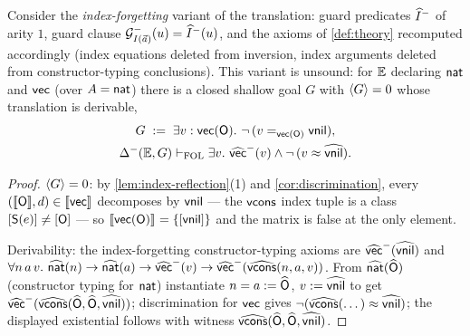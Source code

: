 \begin{proposition}
\label{prop:index-dropping}
Consider the \emph{index-forgetting} variant of the translation: guard
predicates $\widehat{I}^-$ of arity $1$, guard clause
$\mathcal{G}^-_{I(\vec{a})}(u) = \widehat{I}^-(u)$, and the axioms of
\cref{def:theory} recomputed accordingly (index equations deleted from
inversion, index arguments deleted from constructor-typing
conclusions).  This variant is unsound: for $\mathbb{E}$ declaring $\mathsf{nat}$ and
$\mathsf{vec}$ (over $A = \mathsf{nat}$) there is a closed shallow goal $G$ with
$\langle G \rangle = 0$ whose translation is derivable,
\begin{gather*}
  G \;\mathrel{:=}\; \exists v : \mathsf{vec}(\mathsf{O}).\ \neg\,(v =_{\mathsf{vec}(\mathsf{O})}
  \mathsf{vnil}),\\
  \Delta^-(\mathbb{E}, G) \vdash_{\mathrm{FOL}} \exists v.\ \widehat{\mathsf{vec}}^-(v) \wedge
  \neg\,(v \approx \widehat{\mathsf{vnil}}).
\end{gather*}
\end{proposition}

\begin{proof}
$\langle G \rangle = 0$: by \cref{lem:index-reflection}(1) and
\cref{cor:discrimination}, every $([\![ \mathsf{O} ]\!], d) \in [\![ \mathsf{vec} ]\!]_{}$
decomposes by $\mathsf{vnil}$ --- the $\mathsf{vcons}$ index tuple is a class
$[\mathsf{S}(e)] \neq [\mathsf{O}]$ --- so $[\![ \mathsf{vec}(\mathsf{O}) ]\!]_{} =
\{[\mathsf{vnil}]\}$ and the matrix is false at the only element.

Derivability: the index-forgetting constructor-typing axioms are
$\widehat{\mathsf{vec}}^-(\widehat{\mathsf{vnil}})$ and $\forall n\,a\,v.\ \widehat{\mathsf{nat}}(n)
\to \widehat{\mathsf{nat}}(a) \to \widehat{\mathsf{vec}}^-(v) \to
\widehat{\mathsf{vec}}^-(\widehat{\mathsf{vcons}}(n,a,v))$.  From $\widehat{\mathsf{nat}}(\widehat{\mathsf{O}})$
(constructor typing for $\mathsf{nat}$) instantiate $n = a \mathrel{:=} \widehat{\mathsf{O}}$,
$v \mathrel{:=} \widehat{\mathsf{vnil}}$ to get
$\widehat{\mathsf{vec}}^-(\widehat{\mathsf{vcons}}(\widehat{\mathsf{O}}, \widehat{\mathsf{O}},
\widehat{\mathsf{vnil}}))$; discrimination for $\mathsf{vec}$ gives
$\neg(\widehat{\mathsf{vcons}}(\dots) \approx \widehat{\mathsf{vnil}})$; the displayed
existential follows with witness
$\widehat{\mathsf{vcons}}(\widehat{\mathsf{O}},\widehat{\mathsf{O}},\widehat{\mathsf{vnil}})$.
\end{proof}

